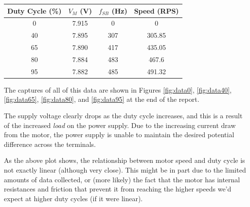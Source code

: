 \documentclass[a4paper, 12pt]{article}
\begin{document}
\begin{table}[ht]
\centering
\begin{tabular}{c|c|c|c}
\textbf{Duty Cycle (\%)} & \textbf{$V_M$ (V)} & \textbf{$f_{SB}$ (Hz)} & \textbf{Speed (RPS)} \\
\hline
0 & 7.915 & 0 & 0 \\
40 & 7.895 & 307 & 305.85 \\
65 & 7.890 & 417 & 435.05 \\
80 & 7.884 & 483 & 467.6 \\
95 & 7.882 & 485 & 491.32 \\
\end{tabular}
\end{table}

The captures of all of this data are shown in Figures \ref{fig:data0}, \ref{fig:data40}, \ref{fig:data65}, \ref{fig:data80}, and  \ref{fig:data95} at the end of the report.

The supply voltage clearly drops as the duty cycle increases, and this is a result of the increased \textit{load} on the power supply. Due to the increasing current draw from the motor, the power supply is unable to maintain the desired potential difference across the terminals.

\begin{center}
\end{center} 

As the above plot shows, the relationship between motor speed and duty cycle is not exactly linear (although very close). This might be in part due to the limited amounts of data collected, or (more likely) the fact that the motor has internal resistances and friction that prevent it from reaching the higher speeds we'd expect at higher duty cycles (if it were linear).
\end{document}
